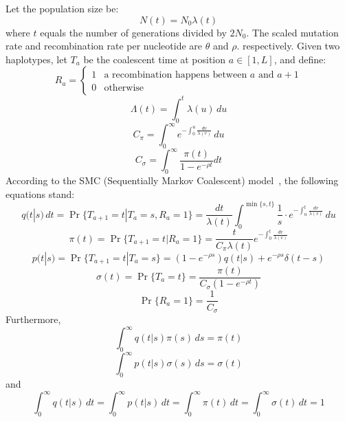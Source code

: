 \documentclass[pdftex,10pt]{article}
\begin{document}
\begin{thm}[PSMC]\label{thm:psmc}
  Let the population size be:
  \begin{equation*}
    N(t)=N_0\lambda(t)
  \end{equation*}
  where $t$ equals the number of generations divided by $2N_0$. The
  scaled mutation rate and recombination rate per nucleotide are
  $\theta$ and $\rho$.  respectively. Given two haplotypes, let $T_a$ be
  the coalescent time at position $a\in[1,L]$, and define:
  \begin{equation*}
    R_a=\left\{\begin{array}{ll}
        1 & \mbox{a recombination happens between $a$ and $a+1$} \\
        0 & \mbox{otherwise}
      \end{array}\right.
  \end{equation*}
  \begin{equation*}
    \Lambda(t)=\int_0^t\lambda(u)\,du
  \end{equation*}
  \begin{equation}
    C_{\pi}=\int_0^{\infty}e^{-\int_0^u\frac{dv}{\lambda(v)}}\,du
  \end{equation}
  \begin{equation}
    C_{\sigma}=\int_0^{\infty}\frac{\pi(t)}{1-e^{-\rho t}}dt
  \end{equation}
  According to the SMC (Sequentially Markov Coalescent)
  model~\citep{McVean:2005lr,Marjoram:2006fk}, the following equations stand:
  \begin{equation}\label{equ:q}
    q(t|s)\,dt=\Pr\{T_{a+1}=t|T_a=s,R_a=1\}
    =\frac{dt}{\lambda(t)}\int_0^{\min\{s,t\}}\frac{1}{s}\cdot e^{-\int_u^t\frac{dv}{\lambda(v)}}\,du
  \end{equation}
  \begin{equation}\label{equ:pi2}
    \pi(t)=\Pr\{T_{a+1}=t|R_a=1\}=\frac{t}{C_{\pi}\lambda(t)}e^{-\int_0^t\frac{dv}{\lambda(v)}}
  \end{equation}
  \begin{equation}\label{equ:a}
    p(t|s)=\Pr\{T_{a+1}=t|T_a=s\}=(1-e^{-\rho s})q(t|s) + e^{-\rho s}\delta(t-s)
  \end{equation}
  \begin{equation}\label{equ:sigma1}
    \sigma(t)=\Pr\{T_a=t\}=\frac{\pi(t)}{C_{\sigma}(1-e^{-\rho t})}
  \end{equation}
  \begin{equation}\label{equ:px}
    \Pr\{R_a=1\}=\frac{1}{C_{\sigma}}
  \end{equation}
  Furthermore,
  \begin{equation}\label{equ:pi3}
    \int_0^{\infty}q(t|s)\pi(s)\,ds=\pi(t)
  \end{equation}
  \begin{equation}\label{equ:sigma2}
    \int_0^{\infty}p(t|s)\sigma(s)\,ds=\sigma(t)
  \end{equation}
  and
  \begin{equation}
    \int_0^{\infty}q(t|s)\,dt=\int_0^{\infty}p(t|s)\,dt=\int_0^{\infty}\pi(t)\,dt
    =\int_0^{\infty}\sigma(t)\,dt=1
  \end{equation}
\end{thm}
\end{document}
